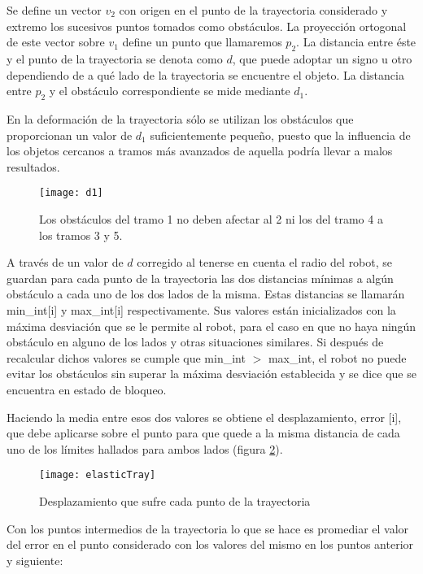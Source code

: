 Se define un vector $v_{2}$ con origen en el punto de la trayectoria considerado y extremo los sucesivos puntos tomados como obstáculos. La proyección ortogonal de este vector sobre $v_{1}$ define un punto que llamaremos $p_{2}$. La distancia entre éste y el punto de la trayectoria se denota como $d$, que puede adoptar un signo u otro dependiendo de a qué lado de la trayectoria se encuentre el objeto. La distancia entre $p_{2}$ y el obstáculo correspondiente se mide mediante $d_{1}$.

En la deformación de la trayectoria sólo se utilizan los obstáculos que proporcionan un valor de $d_{1}$ suficientemente pequeño, puesto que la influencia de los objetos cercanos a tramos más avanzados de aquella podría llevar a malos resultados.

\begin{figure}[h]
  \centering\texttt{[image: d1]}\\
  \caption{Los obstáculos del tramo 1 no deben afectar al 2 ni los del tramo 4 a los tramos 3 y 5.}\label{fg:d1}
\end{figure}

A través de un valor de $d$ corregido al tenerse en cuenta el radio del robot, se guardan para cada punto de la trayectoria las dos distancias mínimas a algún obstáculo a cada uno de los dos lados de la misma. Estas distancias se llamarán min\_int[i] y max\_int[i] respectivamente. Sus valores están inicializados con la máxima desviación que se le permite al robot, para el caso en que no haya ningún obstáculo en alguno de los lados y otras situaciones similares. Si después de recalcular dichos valores se cumple que min\_int $>$ max\_int, el robot no puede evitar los obstáculos sin superar la máxima desviación establecida y se dice que se encuentra en estado de bloqueo.

Haciendo la media entre esos dos valores se obtiene el desplazamiento, error [i], que debe aplicarse sobre el punto para que quede a la misma distancia de cada uno de los límites hallados para ambos lados (figura \ref{fg:elasticTray}).

\begin{figure}[h]
  \centering\texttt{[image: elasticTray]}\\
  \caption{Desplazamiento que sufre cada punto de la trayectoria}\label{fg:elasticTray}
\end{figure}

Con los puntos intermedios de la trayectoria lo que se hace es promediar el valor del error en el punto considerado con los valores del mismo en los puntos anterior y siguiente:


